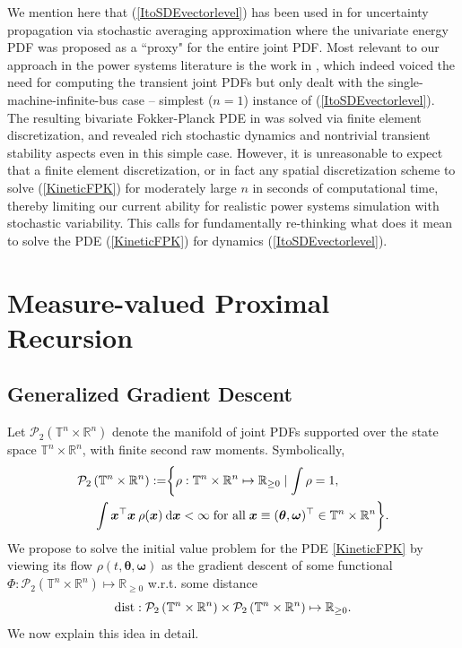 \documentclass[10pt,twocolumn]{IEEEtran}
\newcommand{\differential}{{\rm{d}}}
\begin{document}
We mention here that (\ref{ItoSDEvectorlevel}) has been used in \cite{ju2018analytical,ju2018stochastic} for uncertainty propagation via stochastic averaging approximation where the univariate energy PDF was proposed as a ``proxy" for the entire joint PDF. Most relevant to our approach in the power systems literature is the work in \cite{wang2013fokker}, which indeed voiced the need for computing the transient joint PDFs but only dealt with the single-machine-infinite-bus case -- simplest ($n=1$) instance of (\ref{ItoSDEvectorlevel}). The resulting bivariate Fokker-Planck PDE in \cite{wang2013fokker} was solved via finite element discretization, and revealed rich stochastic dynamics and nontrivial transient stability aspects even in this simple case. However, it is unreasonable to expect that a finite element discretization, or in fact any spatial discretization scheme to solve (\ref{KineticFPK}) for moderately large $n$ in seconds of computational time, thereby limiting our current ability for realistic power systems simulation with stochastic variability. This calls for fundamentally re-thinking what does it mean to solve the PDE (\ref{KineticFPK}) for dynamics (\ref{ItoSDEvectorlevel}).


\section{Measure-valued Proximal Recursion}\label{sec:prox}
\subsection{Generalized Gradient Descent}\label{subsec:GenGradDescent}
Let $\mathcal{P}_{2}\left(\mathbb{T}^{n} \times \mathbb{R}^{n}\right)$ denote the manifold of joint PDFs supported over the state space $\mathbb{T}^{n} \times \mathbb{R}^{n}$, with finite second raw moments. Symbolically,
\begin{align}
\mathcal{P}_{2}\left(\mathbb{T}^{n} \times \mathbb{R}^{n}\right) := &\bigg\{\rho : \mathbb{T}^{n} \times \mathbb{R}^{n} \mapsto \mathbb{R}_{\geq 0} \mid \int \rho = 1,\nonumber\\
&\hspace*{-0.8in}\int\bm{x}^{\top}\bm{x}\:\rho(\bm{x})\:\differential\bm{x} <\infty\; \text{for all}\;\bm{x}\equiv(\bm{\theta},\bm{\omega})^{\top}\in\mathbb{T}^{n} \times \mathbb{R}^{n} \bigg\}.
\label{DefP2}	
\end{align}
We propose to solve the initial value problem for the PDE \eqref{KineticFPK} by viewing its flow $\rho(t,\bm{\theta},\bm{\omega})$ as the gradient descent of some functional $\Phi:\mathcal{P}_{2}\left(\mathbb{T}^{n} \times \mathbb{R}^{n}\right)\mapsto \mathbb{R}_{\geq 0}$ w.r.t. some distance 
\[{\rm{dist}}:\mathcal{P}_{2}\left(\mathbb{T}^{n} \times \mathbb{R}^{n}\right)\times\mathcal{P}_{2}\left(\mathbb{T}^{n} \times \mathbb{R}^{n}\right)\mapsto\mathbb{R}_{\geq 0}.\]
We now explain this idea in detail.
\end{document}

